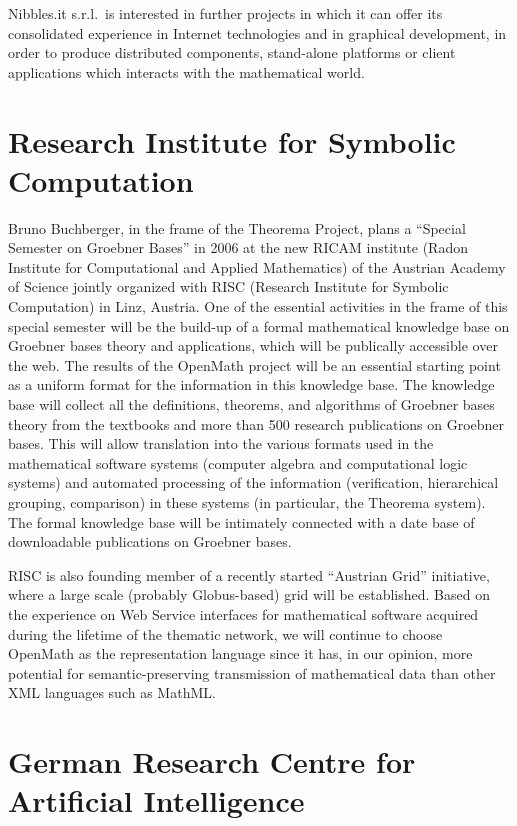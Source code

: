 Nibbles.it s.r.l.~is interested in further projects in which it can
offer its consolidated experience in Internet technologies and in
graphical development, in order to produce distributed components,
stand-alone platforms or client applications which interacts with the
mathematical world.


\section{Research Institute for Symbolic Computation}

Bruno Buchberger, in the frame of the Theorema Project, plans a ``Special
Semester on Groebner Bases'' in 2006 at the new RICAM institute (Radon
Institute for Computational and Applied Mathematics) of the Austrian
Academy of Science jointly organized with RISC (Research Institute for
Symbolic Computation) in Linz, Austria. One of the essential activities
in the frame of this special semester will be the build-up of a formal
mathematical knowledge base on Groebner bases theory and applications,
which will be publically accessible over the web. The results of the
OpenMath project will be an essential starting point as a uniform format
for the  information in this knowledge base. The knowledge base will
collect all the definitions, theorems, and algorithms of Groebner bases
theory  from the  textbooks and more than 500 research publications on
Groebner bases. This will allow translation into the various formats
used in the mathematical software systems (computer algebra and
computational logic systems) and automated processing of the information
(verification, hierarchical grouping, comparison) in these systems (in
particular, the Theorema system). The formal knowledge base will be
intimately connected with a date base of downloadable publications on
Groebner bases.

RISC is also founding member of a recently started ``Austrian Grid''
initiative, where a large scale (probably Globus-based) grid will be
established. Based on the experience on Web Service interfaces for
mathematical software acquired during the lifetime of the thematic
network, we will continue to choose OpenMath as the representation
language since it has, in our opinion, more potential for
semantic-preserving transmission of mathematical data than other XML
languages such as MathML.

\section{German Research Centre for Artificial Intelligence}

